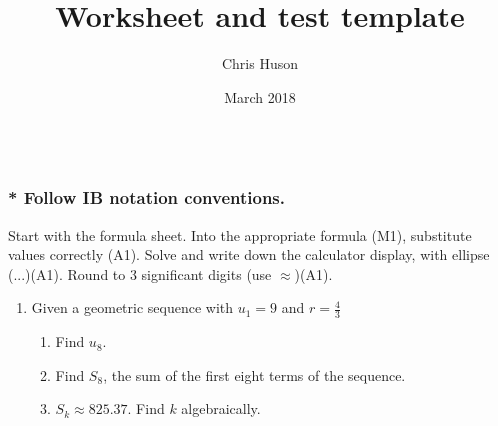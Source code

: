 \documentclass[12pt, oneside]{article}
\title{Worksheet and test template}
\author{Chris Huson}
\date{March 2018}
\begin{document}
\subsubsection*{\\* Follow IB notation conventions.} Start with the formula sheet. Into the appropriate formula (M1), substitute values correctly (A1). Solve and write down the calculator display, with ellipse (...)(A1). Round to 3 significant digits (use $\approx$)(A1).

\begin{enumerate}

\vspace{0.5 cm}

\subsubsection*{Geometric sequence and series}

\item Given a geometric sequence with $u_1=9$ and $r=\frac{4}{3}$
  \begin{enumerate}
      \item Find $u_8$.\\[115pt]
      \item Find $S_8$, the sum of the first eight terms of the sequence.\\[155pt]
      \item $S_k\approx 825.37$. Find $k$ algebraically.
  \end{enumerate}


\end{enumerate}
\end{document}
